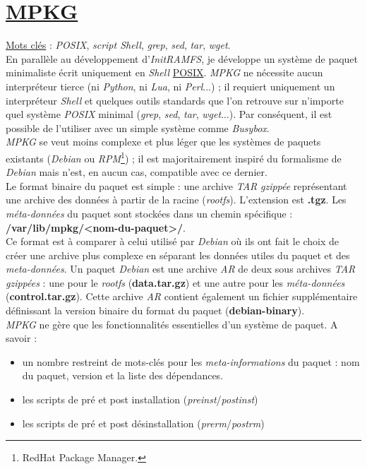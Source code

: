 \documentclass[a4paper]{article}
\begin{document}
\section{\href{https://github.com/gazoo74/mpkg/}{MPKG}}

\underline{Mots clés} : \textit{POSIX}, \textit{script Shell}, \textit{grep}, \textit{sed}, \textit{tar}, \textit{wget}.\\

En parallèle au développement d'\textit{InitRAMFS}, je développe un système de paquet minimaliste écrit uniquement en \textit{Shell} \href{https://fr.wikipedia.org/wiki/POSIX}{POSIX}. \textit{MPKG} ne nécessite aucun interpréteur tierce (ni \textit{Python}, ni \textit{Lua}, ni \textit{Perl}...) ; il requiert uniquement un interpréteur \textit{Shell} et quelques outils standards que l'on retrouve sur n'importe quel système \textit{POSIX} minimal (\textit{grep}, \textit{sed}, \textit{tar}, \textit{wget}...). Par conséquent, il est possible de l'utiliser avec un simple système comme \textit{Busybox}.\\

\textit{MPKG} se veut moins complexe et plus léger que les systèmes de paquets existants (\textit{Debian} ou \textit{RPM}\footnote{RedHat Package Manager.}) ; il est majoritairement inspiré du formalisme de \textit{Debian} mais n'est, en aucun cas, compatible avec ce dernier.\\

Le format binaire du paquet est simple : une archive \textit{TAR} \textit{gzippée} représentant une archive des données à partir de la racine (\textit{rootfs}). L’extension est \textbf{.tgz}. Les \textit{méta-données} du paquet sont stockées dans un chemin spécifique : \textbf{/var/lib/mpkg/<nom-du-paquet>/}.\\

Ce format est à comparer à celui utilisé par \textit{Debian} où ils ont fait le choix de créer une archive plus complexe en séparant les données utiles du paquet et des \textit{meta-données}. Un paquet \textit{Debian} est une archive \textit{AR} de deux sous archives \textit{TAR} \textit{gzippées} : une pour le \textit{rootfs} (\textbf{data.tar.gz}) et une autre pour les \textit{méta-données} (\textbf{control.tar.gz}). Cette archive \textit{AR} contient également un fichier supplémentaire définissant la version binaire du format du paquet (\textbf{debian-binary}).\\

\textit{MPKG} ne gère que les fonctionnalités essentielles d'un système de paquet. A savoir :
\begin{itemize}
\item un nombre restreint de mots-clés pour les \textit{meta-informations} du paquet : nom du paquet, version et la liste des dépendances.
\item les scripts de pré et post installation (\textit{preinst}/\textit{postinst})
\item les scripts de pré et post désinstallation (\textit{prerm}/\textit{postrm})
\end{itemize}
\end{document}
